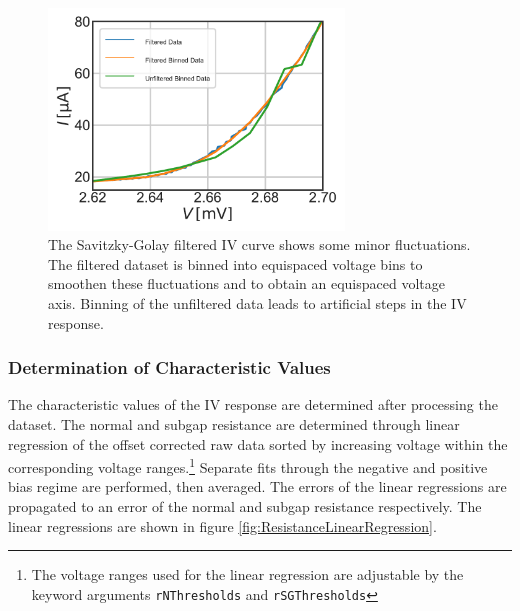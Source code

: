 \documentclass[]{article}
\begin{document}
\begin{figure}
	\centering
	\includegraphics[width=0.7\textwidth]{./../IV_Class_Unit_Test/2020_01_14/Filtered_Binning_Impact_Raw_Data.pdf}
	\caption{The Savitzky-Golay filtered IV curve shows some minor fluctuations. The filtered dataset is binned into equispaced voltage bins to smoothen these fluctuations and to obtain an equispaced voltage axis. Binning of the unfiltered data leads to artificial steps in the IV response. }
	\label{fig:Filtered_Binning_Impact_Raw_Data}
\end{figure}

\subsubsection{Determination of Characteristic Values}
The characteristic values of the IV response are determined after processing the dataset. The normal and subgap resistance are determined through linear regression of the offset corrected raw data sorted by increasing voltage within the corresponding voltage ranges.\footnote{The voltage ranges used for the linear regression are adjustable by the keyword arguments \texttt{rNThresholds} and \texttt{rSGThresholds}} Separate fits through the negative and positive bias regime are performed, then averaged. The errors of the linear regressions are propagated to an error of the normal and subgap resistance respectively. The linear regressions are shown in figure \ref{fig:ResistanceLinearRegression}.
\end{document}
